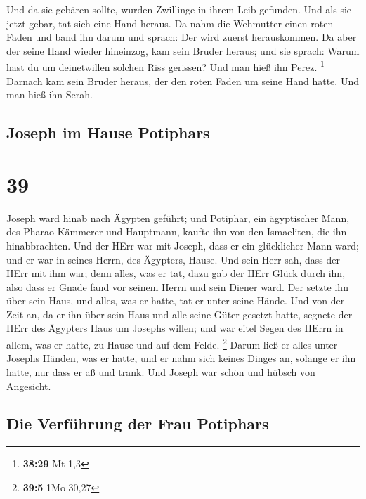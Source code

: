  Und da sie gebären sollte, wurden Zwillinge in ihrem
Leib gefunden.  Und als sie jetzt gebar, tat sich eine
Hand heraus. Da nahm die Wehmutter einen roten Faden und band ihn darum
und sprach: Der wird zuerst herauskommen.  Da aber der
seine Hand wieder hineinzog, kam sein Bruder heraus; und sie sprach:
Warum hast du um deinetwillen solchen Riss gerissen? Und man hieß ihn
Perez. \footnote{\textbf{38:29} Mt 1,3}  Darnach kam sein
Bruder heraus, der den roten Faden um seine Hand hatte. Und man hieß ihn
Serah.

\hypertarget{joseph-im-hause-potiphars}{%
\subsection{Joseph im Hause Potiphars}\label{joseph-im-hause-potiphars}}

\hypertarget{section-38}{%
\section{39}\label{section-38}}

 Joseph ward hinab nach Ägypten geführt; und Potiphar, ein
ägyptischer Mann, des Pharao Kämmerer und Hauptmann, kaufte ihn von den
Ismaeliten, die ihn hinabbrachten.  Und der HErr war mit
Joseph, dass er ein glücklicher Mann ward; und er war in seines Herrn,
des Ägypters, Hause.  Und sein Herr sah, dass der HErr mit
ihm war; denn alles, was er tat, dazu gab der HErr Glück durch ihn,
 also dass er Gnade fand vor seinem Herrn und sein Diener
ward. Der setzte ihn über sein Haus, und alles, was er hatte, tat er
unter seine Hände.  Und von der Zeit an, da er ihn über
sein Haus und alle seine Güter gesetzt hatte, segnete der HErr des
Ägypters Haus um Josephs willen; und war eitel Segen des HErrn in allem,
was er hatte, zu Hause und auf dem Felde. \footnote{\textbf{39:5} 1Mo
  30,27}  Darum ließ er alles unter Josephs Händen, was er
hatte, und er nahm sich keines Dinges an, solange er ihn hatte, nur dass
er aß und trank. Und Joseph war schön und hübsch von Angesicht.

\hypertarget{die-verfuxfchrung-der-frau-potiphars}{%
\subsection{Die Verführung der Frau
Potiphars}\label{die-verfuxfchrung-der-frau-potiphars}}

